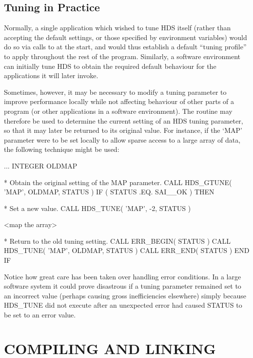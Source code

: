\documentclass[twoside,11pt]{starlink}
\providecommand{\qt}[1]{``#1''}
\begin{document}
\subsection{\label{sect:gtune}Tuning in Practice}

Normally, a single application which wished to tune HDS itself (rather
than accepting the default settings, or those specified by environment
variables) would do so via calls to  at
the start, and would thus establish a default \qt{tuning profile} to
apply throughout the rest of the program.  Similarly, a software
environment can initially tune HDS to obtain the required default
behaviour for the applications it will later invoke.

Sometimes, however, it may be necessary to modify a tuning parameter
to improve performance locally while not affecting behaviour of other
parts of a program (or other applications in a software
environment). The routine  may
therefore be used to determine the current setting of an HDS tuning
parameter, so that it may later be returned to its original value. For
instance, if the `MAP' parameter were to be set locally to allow
sparse access to a large array of data, the following technique might
be used:

\begin{small}
\begin{terminalv}
      ...
      INTEGER OLDMAP

*  Obtain the original setting of the MAP parameter.
      CALL HDS_GTUNE( 'MAP', OLDMAP, STATUS )
      IF ( STATUS .EQ. SAI__OK ) THEN

*  Set a new value.
         CALL HDS_TUNE( 'MAP', -2, STATUS )

         <map the array>

*  Return to the old tuning setting.
         CALL ERR_BEGIN( STATUS )
         CALL HDS_TUNE( 'MAP', OLDMAP, STATUS )
         CALL ERR_END( STATUS )
      END IF
\end{terminalv}
\end{small}

Notice how great care has been taken over handling error
conditions. In a large software system it could prove disastrous if a
tuning parameter remained set to an incorrect value (perhaps causing
gross inefficiencies elsewhere) simply because HDS\_TUNE did not
execute after an unexpected error had caused STATUS to be set to an
error value.

\section{COMPILING AND LINKING}
\end{document}
